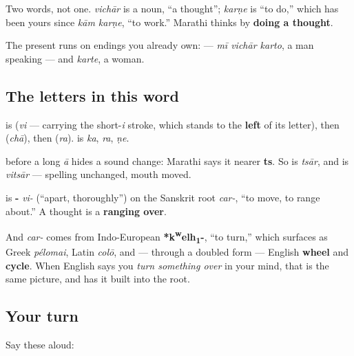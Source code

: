 Two words, not one. \textbf{} \emph{vichār} is a noun, \textquotedblleft{}a thought\textquotedblright{}; \textbf{} \emph{karṇe} is \textquotedblleft{}to do,\textquotedblright{} which has been yours since \emph{kām karṇe}, \textquotedblleft{}to work.\textquotedblright{} Marathi thinks by \textbf{doing a thought}.

The present runs on endings you already own: \textbf{  } — \emph{mī vichār karto}, a man speaking — and \textbf{} \emph{karte}, a woman.

\subsection*{The letters in this word}
\textbf{} is \textbf{} (\emph{vi} —  carrying the short-\emph{i} stroke, which stands to the \textbf{left} of its letter), then \textbf{} (\emph{chā}), then \textbf{} (\emph{ra}). \textbf{} is \textbf{} \emph{ka}, \textbf{} \emph{ra}, \textbf{} \emph{ṇe}.

\begin{sounds}
\textbf{} before a long \emph{ā} hides a sound change: Marathi says it nearer \textbf{ts}. So \textbf{} is \emph{tsār}, and \textbf{} is \emph{vitsār} — spelling unchanged, mouth moved.
\end{sounds}

\begin{cousinweb}
\textbf{} is \textbf{-} \emph{vi-} (\textquotedblleft{}apart, thoroughly\textquotedblright{}) on the Sanskrit root \textbf{} \emph{car-}, \textquotedblleft{}to move, to range about.\textquotedblright{} A thought is a \textbf{ranging over}.

And \emph{car-} comes from Indo-European \textbf{*k\textsuperscript{w}elh\textsubscript{1}-}, \textquotedblleft{}to turn,\textquotedblright{} which surfaces as Greek \emph{pélomai}, Latin \emph{colō}, and — through a doubled form — English \textbf{wheel} and \textbf{cycle}. When English says you \emph{turn something over} in your mind, that is the same picture, and \textbf{} has it built into the root.
\end{cousinweb}

\subsection*{Your turn}
Say these aloud:

